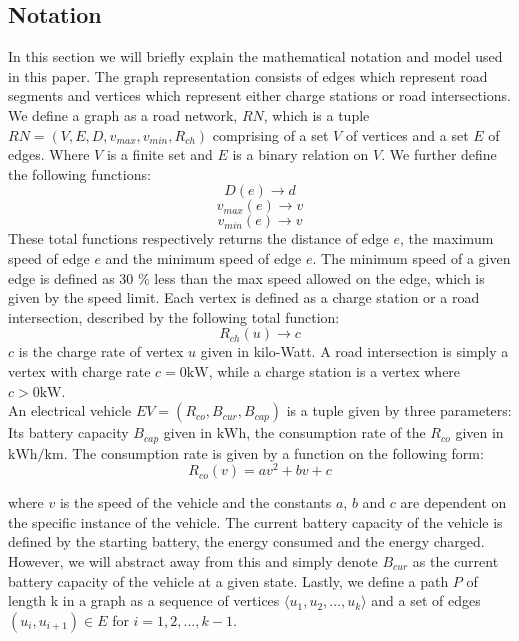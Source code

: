 \subsection{Notation} \label{sec:notation}
In this section we will briefly explain the mathematical notation and model used in this paper. The graph representation consists of edges which represent road segments and vertices which represent either charge stations or road intersections. We define a graph as a road network, $RN$, which is a tuple $RN=(V,E,D,v_{max},v_{min},R_{ch})$ comprising of a set $V$ of vertices and a set $E$ of edges. Where $V$ is a finite set and $E$ is a binary relation on $V$. We further define the following functions:
\[ D(e)\rightarrow d \] 
\[ v_{max}(e)\rightarrow v \]
\[ v_{min}(e)\rightarrow v \]
These total functions respectively returns the distance of edge $e$, the maximum speed of edge $e$ and the minimum speed of edge $e$. The minimum speed of a given edge is defined as 30 \% less than the max speed allowed on the edge, which is given by the speed limit. Each vertex is defined as a charge station or a road intersection, described by the following total function:
\[R_{ch}(u)\rightarrow c\]
$c$ is the charge rate of vertex $u$ given in kilo-Watt. A road intersection is simply a vertex with charge rate $c = 0\si{\kW}$, while a charge station is a vertex where $c > 0\si{\kW}$.\\ 

An electrical vehicle $EV=(R_{co},B_{cur},B_{cap})$ is a tuple given by three parameters: Its battery capacity $B_{cap}$ given in $\si{\kWh}$, the consumption rate of the $R_{co}$ given in $\si{\kWh\per\km}$. The consumption rate is given by a function on the following form:
\[ R_{co}(v)=av^2+bv+c \]

where $v$ is the speed of the vehicle and the constants $a$, $b$ and $c$ are dependent on the specific instance of the vehicle. The current battery capacity of the vehicle is defined by the starting battery, the energy consumed and the energy charged. However, we will abstract away from this and simply denote $B_{cur}$ as the current battery capacity of the vehicle at a given state. Lastly, we define a path $P$ of length k in a graph as a sequence of vertices $\langle u_1,u_2,\dots,u_k \rangle$ and a set of edges $(u_{i},u_{i+1})\in E$ for $i=1,2,\dots,k-1$.


